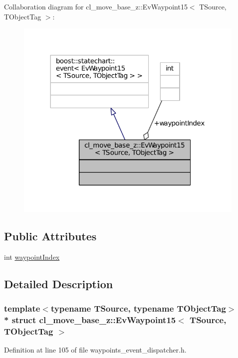Collaboration diagram for cl\+\_\+move\+\_\+base\+\_\+z\+:\+:Ev\+Waypoint15$<$ T\+Source, T\+Object\+Tag $>$\+:
\nopagebreak
\begin{figure}[H]
\begin{center}
\leavevmode
\includegraphics[width=312pt]{structcl__move__base__z_1_1EvWaypoint15__coll__graph}
\end{center}
\end{figure}
\subsection*{Public Attributes}
\begin{DoxyCompactItemize}
\item 
int \hyperlink{structcl__move__base__z_1_1EvWaypoint15_a227d0c43ea33af9e1033a959a9900604}{waypoint\+Index}
\end{DoxyCompactItemize}


\subsection{Detailed Description}
\subsubsection*{template$<$typename T\+Source, typename T\+Object\+Tag$>$\\*
struct cl\+\_\+move\+\_\+base\+\_\+z\+::\+Ev\+Waypoint15$<$ T\+Source, T\+Object\+Tag $>$}



Definition at line 105 of file waypoints\+\_\+event\+\_\+dispatcher.\+h.



